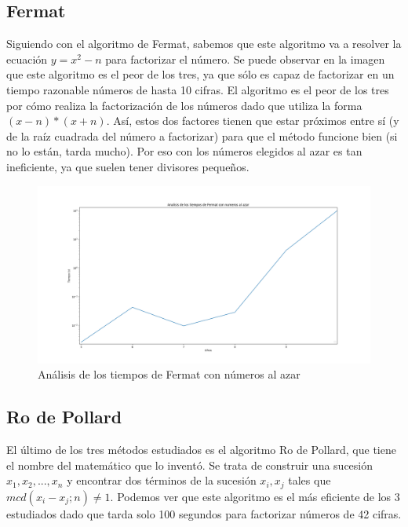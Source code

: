 \documentclass{article}
\begin{document}
    \newpage

    \subsection{Fermat}
    Siguiendo con el algoritmo de Fermat, sabemos que este algoritmo va a resolver la ecuación \begin{math} y = x ^{2} - n \end{math} para factorizar el número. Se puede observar en la imagen que este algoritmo es el peor de los tres, ya que sólo es capaz de factorizar en un tiempo razonable números de hasta 10 cifras. El algoritmo es el peor de los tres por cómo realiza la factorización de los números dado que utiliza la forma \begin{math} (x-n)*(x+n)\end{math}. Así, estos dos factores tienen que estar próximos entre sí (y de la raíz cuadrada del número a factorizar) para que el método funcione bien (si no lo están, tarda mucho). Por eso con los números elegidos al azar es tan ineficiente, ya que suelen tener divisores pequeños.



    \begin{figure}[ht!]
        \centering
        \includegraphics[width=\linewidth]{Figure_3}
        \caption{Análisis de los tiempos de Fermat con números al azar}
        \label{fig:Figure_3}
    \end{figure}

    \newpage

    \subsection{Ro de Pollard}
    El último de los tres métodos estudiados es el algoritmo Ro de Pollard, que tiene el nombre del matemático que lo inventó. Se trata de construir una sucesión
    \begin{math} x_{1}, x_{2}, ..., x_{n} \end{math} y encontrar dos términos de la sucesión
    \begin{math}  x_{i}, x_{j} \end{math} tales que \begin{math} mcd(x_{i} - x_{j} ; n) \neq 1. \end{math} Podemos ver que este algoritmo es el más eficiente de los 3 estudiados dado que tarda solo 100 segundos para factorizar números de 42 cifras.
\end{document}
